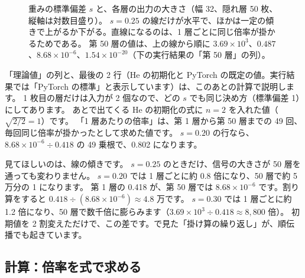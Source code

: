 \begin{figure}[tbp]
\centering
{}
\caption{重みの標準偏差 $s$ と、各層の出力の大きさ（幅 32、隠れ層 50 枚、縦軸は対数目盛り）。
$s=0.25$ の線だけが水平で、ほかは一定の傾きで上がるか下がる。直線になるのは、1 層ごとに同じ倍率が掛かるためである。
第 50 層の値は、上の線から順に $3.69\times10^{3}$、$0.487$、$8.68\times10^{-6}$、$1.54\times10^{-20}$（下の実行結果の「第 50 層」の列）。}
\label{fig:training-init-signal}
\end{figure}


「理論値」の列と、最後の 2 行（He の初期化と PyTorch の既定の値。実行結果では「PyTorch の標準」と表示しています）は、このあとの計算で説明します。
1 枚目の層だけは入力が 2 個なので、どの $s$ でも同じ決め方（標準偏差 1）にしてあります。
あとで出てくる He の初期化の式に $n=2$ を入れた値（$\sqrt{2/2}=1$）です。
「1 層あたりの倍率」は、第 1 層から第 50 層までの 49 回、毎回同じ倍率が掛かったとして求めた値です。
$s=0.20$ の行なら、$8.68\times10^{-6}\div0.418$ の 49 乗根で、0.802 になります。

見てほしいのは、線の傾きです。
$s=0.25$ のときだけ、信号の大きさが 50 層を通っても変わりません。
$s=0.20$ では 1 層ごとに約 0.8 倍になり、50 層で約 5 万分の 1 になります。
第 1 層の 0.418 が、第 50 層では $8.68\times10^{-6}$ です。割り算をすると $0.418\div(8.68\times10^{-6})\approx4.8$ 万です。
$s=0.30$ では 1 層ごとに約 1.2 倍になり、50 層で数千倍に膨らみます（$3.69\times10^{3}\div0.418\approx8{,}800$ 倍）。
初期値を 2 割変えただけで、この差です。で見た「掛け算の繰り返し」が、順伝播でも起きています。

\subsection*{計算：倍率を式で求める}

